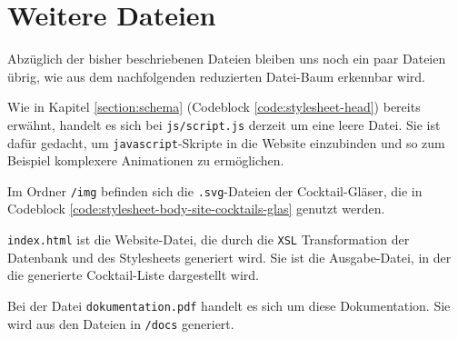 



\section{Weitere Dateien}
\label{section:weiteredateien}

Abzüglich der bisher beschriebenen Dateien bleiben uns noch ein paar Dateien übrig, wie aus dem nachfolgenden reduzierten Datei-Baum erkennbar wird.

\setlength{\DTbaselineskip}{20pt}

Wie in Kapitel \ref{section:schema} (Codeblock \ref{code:stylesheet-head}) bereits erwähnt, handelt es sich bei \texttt{js/script.js} derzeit um eine leere Datei. Sie ist dafür gedacht, um \texttt{javascript}-Skripte in die Website einzubinden und so zum Beispiel komplexere Animationen zu ermöglichen.

Im Ordner \texttt{/img} befinden sich die \texttt{.svg}-Dateien der Cocktail-Gläser, die in Codeblock \ref{code:stylesheet-body-site-cocktails-glas} genutzt werden.

\texttt{index.html} ist die Website-Datei, die durch die \texttt{XSL} Transformation der Datenbank und des Stylesheets generiert wird. Sie ist die Ausgabe-Datei, in der die generierte Cocktail-Liste dargestellt wird.

Bei der Datei \texttt{dokumentation.pdf} handelt es sich um diese Dokumentation. Sie wird aus den Dateien in \texttt{/docs} generiert. 